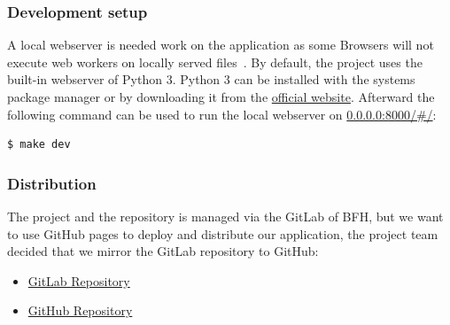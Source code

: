 \subsubsection{Development setup}\label{subsubsec:deployment-setup}
A local webserver is needed work on the application as some Browsers will not execute web workers on locally served files~\cite{stackoverflow_chrome_cant_load_web_worker}.
By default, the project uses the built-in webserver of Python 3.
Python 3 can be installed with the systems package manager or by downloading it from the \href{https://www.python.org/downloads/}{official website}.
Afterward the following command can be used to run the local webserver on \href{http://0.0.0.0:8000/}{0.0.0.0:8000/\#/}:

\begin{lstlisting}[caption={Makefile: Start local webserver},label={lst:makefile_start_local_webserver},language=Bash]
$ make dev
\end{lstlisting}

\subsubsection{Distribution}
The project and the repository is managed via the GitLab of BFH,
but we want to use GitHub pages to deploy and distribute our application,
the project team decided that we mirror the GitLab repository to GitHub:
\begin{itemize}
    \item \href{https://gitlab.ti.bfh.ch/decibel-threshold-event-displayer/decibel-threshold-event-displayer}{GitLab Repository}
    \item \href{https://github.com/decibel-threshold-event-displayer/decibel-threshold-event-displayer.github.io}{GitHub Repository}
\end{itemize}

